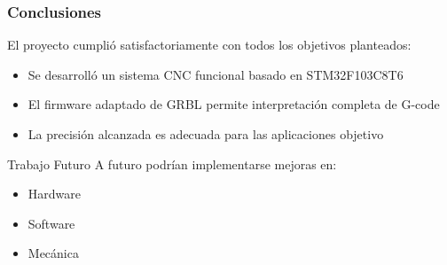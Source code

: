 \documentclass{beamer}
\begin{document}
\begin{frame}
    \frametitle{Conclusiones}
El proyecto cumplió satisfactoriamente con todos los objetivos planteados:

\begin{itemize}
    \item Se desarrolló un sistema CNC funcional basado en STM32F103C8T6
    \item El firmware adaptado de GRBL permite interpretación completa de G-code
    \item La precisión alcanzada es adecuada para las aplicaciones objetivo
\end{itemize}

\begin{block}{Trabajo Futuro}
A futuro podrían implementarse mejoras en:

\begin{itemize}
    \item Hardware
    \item Software
    \item Mecánica
\end{itemize}

\end{block}
\end{frame}
\end{document}
